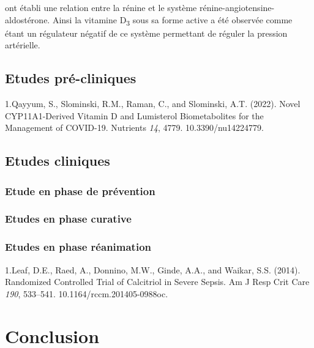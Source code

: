 \documentclass[
  a4paper,
  DIV=11,
  numbers=noendperiod,
  listof=totoc]{scrreprt}
\begin{document}
\textcite{Li.2002} ont établi une relation entre la rénine et le système
rénine-angiotensine-aldostérone. Ainsi la vitamine D\textsubscript{3}
sous sa forme active a été observée comme étant un régulateur négatif de
ce système permettant de réguler la pression artérielle.

\hypertarget{etudes-pruxe9-cliniques}{%
\section{Etudes pré-cliniques}\label{etudes-pruxe9-cliniques}}

1.Qayyum, S., Slominski, R.M., Raman, C., and Slominski, A.T. (2022).
Novel CYP11A1-Derived Vitamin D and Lumisterol Biometabolites for the
Management of COVID-19. Nutrients \emph{14}, 4779. 10.3390/nu14224779.

\hypertarget{etudes-cliniques}{%
\section{Etudes cliniques}\label{etudes-cliniques}}

\hypertarget{etude-en-phase-de-pruxe9vention}{%
\subsection{Etude en phase de
prévention}\label{etude-en-phase-de-pruxe9vention}}

\hypertarget{etudes-en-phase-curative}{%
\subsection{Etudes en phase curative}\label{etudes-en-phase-curative}}

\hypertarget{etudes-en-phase-ruxe9animation}{%
\subsection{Etudes en phase
réanimation}\label{etudes-en-phase-ruxe9animation}}

1.Leaf, D.E., Raed, A., Donnino, M.W., Ginde, A.A., and Waikar, S.S.
(2014). Randomized Controlled Trial of Calcitriol in Severe Sepsis. Am J
Resp Crit Care \emph{190}, 533--541. 10.1164/rccm.201405-0988oc.

\newpage{}

\hypertarget{conclusion}{%
\chapter{Conclusion}\label{conclusion}}

\newpage{}


\printbibliography[title=Références]
\end{document}

